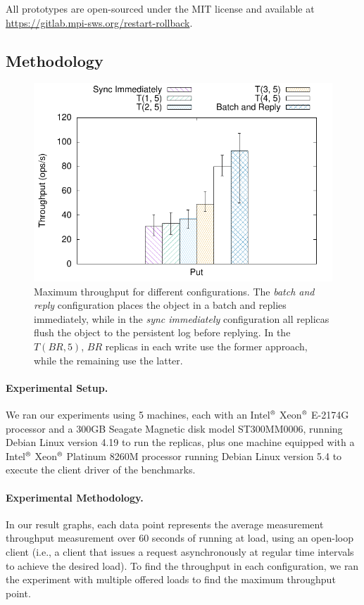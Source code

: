 All prototypes are open-sourced under the MIT license
and available at \url{https://gitlab.mpi-sws.org/restart-rollback}.

\subsection{Methodology}\label{ssec:r2s2methodology}

\begin{figure}[t]
    \centering
    \includegraphics[width=.75\linewidth]{r2s2_results/abd_small/tput.pdf}
    \caption{Maximum throughput for different configurations.
    The \emph{batch and reply} configuration places the
    object in a batch and replies immediately, while in the
    \emph{sync immediately} configuration all replicas
    flush the object to the persistent log before replying. In
    the $T(BR, 5)$, $BR$ replicas in each write use the former
    approach, while the remaining use the
    latter.}\label{fig:r2s2_asym}
\end{figure}
\paragraph{Experimental Setup.}
We ran our experiments using 5 machines, each with an
Intel$^\text{\textregistered}$ Xeon$^\text{\textregistered}$
E-2174G processor and a 300GB Seagate Magnetic disk model
ST300MM0006, running Debian Linux version 4.19 to run the
replicas, plus one machine equipped with a
Intel$^\text{\textregistered}$ Xeon$^\text{\textregistered}$
Platinum 8260M processor running Debian Linux version 5.4 to
execute the client driver of the benchmarks.

\paragraph{Experimental Methodology.} In our result graphs, each data point represents the average
measurement throughput measurement over $60$ seconds of running
at load, using an open-loop client (i.e., a client that issues a
request asynchronously at regular time intervals to achieve the
desired load). To find the throughput in each configuration, we
ran the experiment with multiple offered loads to find the
maximum throughput point.


